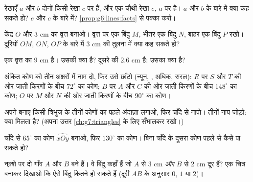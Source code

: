 \begin{exercise}[$\star$]\label{exo:g6:lines:4}
रेखाएँ $a$ और $b$ दोनों किसी रेखा $c$ पर  हैं, और एक चौथी
रेखा $e$, $a$ पर  है। $a$ और $b$ के बारे में क्या कह सकते हो?
$e$ और $c$ के बारे में? \cref{prop:g6:lines:facts} से पक्का करो।
\end{exercise}

\begin{exercise}[$\star$]\label{exo:g6:lines:5}
केंद्र $O$ और  $3$ cm का वृत्त बनाओ। वृत्त पर एक बिंदु
$M$, भीतर एक बिंदु $N$, बाहर एक बिंदु $P$ रखो। दूरियों $OM$,
$ON$, $OP$ के बारे में $3$ cm की तुलना में क्या कह सकते हो?
\end{exercise}

\begin{exercise}[$\star$]\label{exo:g6:lines:6}
एक वृत्त का  $9$ cm है। उसकी  क्या है? दूसरे की
 $2.6$ cm है: उसका  क्या है?
\end{exercise}

\begin{exercise}[$\star$]\label{exo:g6:lines:7}
अंकित कोण को तीन अक्षरों में नाम दो, फिर उसे छाँटो (न्यून,
, अधिक, सरल):  $R$ पर $S$ और $T$ की ओर जाती किरणों के
बीच $72^\circ$ का कोण;  $B$ पर $A$ और $C$ की ओर जाती किरणों
के बीच $148^\circ$ का कोण;  $O$ पर $M$ और $N$ की ओर जाती
किरणों के बीच $90^\circ$ का कोण।
\end{exercise}

\begin{exercise}[$\star$]\label{exo:g6:lines:8}
अपने बनाए किसी त्रिभुज के तीनों कोणों का पहले अंदाज़ा लगाओ, फिर
चाँदे से नापो। तीनों नाप जोड़ो: क्या मिलता है? (अपना उत्तर
\cref{ch:g7:triangles} के लिए सँभालकर रखो।)
\end{exercise}

\begin{exercise}[$\star$]\label{exo:g6:lines:9}
चाँदे से $65^\circ$ का कोण $\widehat{xOy}$ बनाओ, फिर $130^\circ$
का कोण। बिना चाँदे के दूसरा कोण पहले से कैसे पा सकते हो?
\end{exercise}

\begin{exercise}[$\star\star$]\label{exo:g6:lines:10}
नक़्शे पर दो गाँव $A$ और $B$ बने हैं। वे बिंदु कहाँ हैं जो $A$ से
$3$ cm \emph{और} $B$ से $2$ cm दूर हैं? एक चित्र बनाकर दिखाओ कि
ऐसे बिंदु कितने हो सकते हैं (दूरी $AB$ के अनुसार $0$, $1$ या $2$)।
\end{exercise}

